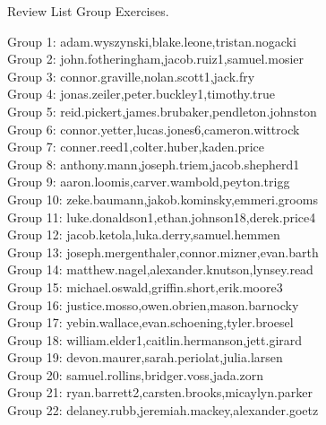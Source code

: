 \documentclass[10pt]{beamer}
\begin{document}
\begin{frame}[standout]
Review List Group Exercises.	
\end{frame}




\begin{frame}
\footnotesize
Group 1: adam.wyszynski,blake.leone,tristan.nogacki\\
Group 2: john.fotheringham,jacob.ruiz1,samuel.mosier\\
Group 3: connor.graville,nolan.scott1,jack.fry\\
Group 4: jonas.zeiler,peter.buckley1,timothy.true\\
Group 5: reid.pickert,james.brubaker,pendleton.johnston\\
Group 6: connor.yetter,lucas.jones6,cameron.wittrock\\
Group 7: conner.reed1,colter.huber,kaden.price\\
Group 8: anthony.mann,joseph.triem,jacob.shepherd1\\
Group 9: aaron.loomis,carver.wambold,peyton.trigg\\
Group 10: zeke.baumann,jakob.kominsky,emmeri.grooms\\
Group 11: luke.donaldson1,ethan.johnson18,derek.price4\\
Group 12: jacob.ketola,luka.derry,samuel.hemmen\\
Group 13: joseph.mergenthaler,connor.mizner,evan.barth\\
Group 14: matthew.nagel,alexander.knutson,lynsey.read\\
Group 15: michael.oswald,griffin.short,erik.moore3\\
Group 16: justice.mosso,owen.obrien,mason.barnocky\\
Group 17: yebin.wallace,evan.schoening,tyler.broesel\\
Group 18: william.elder1,caitlin.hermanson,jett.girard\\
Group 19: devon.maurer,sarah.periolat,julia.larsen\\
Group 20: samuel.rollins,bridger.voss,jada.zorn\\
Group 21: ryan.barrett2,carsten.brooks,micaylyn.parker\\
Group 22: delaney.rubb,jeremiah.mackey,alexander.goetz\\
\end{frame}
\end{document}
